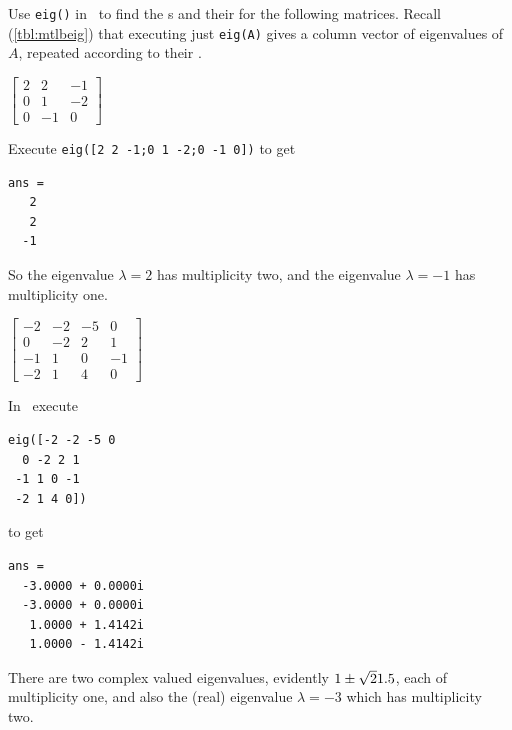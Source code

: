 \begin{example} \label{eg:multeval}
Use \verb|eig()| in \script\  to find the s and their  for the following matrices.
Recall (\cref{tbl:mtlbeig}) that executing just \verb|eig(A)| gives a column vector of eigenvalues of~\(A\), repeated according to their . 

\begin{Parts}
\item \(\begin{bmatrix}2&2&-1
\\0&1&-2
\\0&-1&0\end{bmatrix}\)
\begin{solution} 
Execute \verb|eig([2 2 -1;0 1 -2;0 -1 0])| to get
\setbox\ajrqrbox\hbox{}%
\marginajrbox%
\begin{verbatim}
ans =
   2
   2
  -1
\end{verbatim}
So the eigenvalue \(\lambda=2\) has multiplicity two, and the eigenvalue \(\lambda=-1\) has multiplicity one.
\end{solution}


\item \(\begin{bmatrix}-2&-2&-5&0
\\0&-2&2&1
\\-1&1&0&-1
\\-2&1&4&0\end{bmatrix}\)
\begin{solution} 
In \script\ execute
\begin{verbatim}
eig([-2 -2 -5 0
  0 -2 2 1
 -1 1 0 -1
 -2 1 4 0])
\end{verbatim}
\setbox\ajrqrbox\hbox{}%
\marginajrbox%
to get
\begin{verbatim}
ans =
  -3.0000 + 0.0000i
  -3.0000 + 0.0000i
   1.0000 + 1.4142i
   1.0000 - 1.4142i
\end{verbatim}
There are two complex valued eigenvalues, evidently \(1\pm\sqrt21.5\), each of multiplicity one, and also the (real) eigenvalue \(\lambda=-3\) which has multiplicity two.
\end{solution}



\end{Parts}
\end{example}
